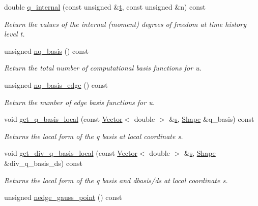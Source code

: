 \begin{DoxyCompactItemize}
double \hyperlink{classoomph_1_1TPoroelasticityElement_a6ac708ffa8850ca009ccedbb651a3152}{q\+\_\+internal} (const unsigned \&\hyperlink{cfortran_8h_af6f0bd3dc13317f895c91323c25c2b8f}{t}, const unsigned \&n) const
\begin{DoxyCompactList}\small\item\em Return the values of the internal (moment) degrees of freedom at time history level t. \end{DoxyCompactList}\item 
unsigned \hyperlink{classoomph_1_1TPoroelasticityElement_afdb47aa5ae5af5ddcc4bf3d1fbd4b066}{nq\+\_\+basis} () const
\begin{DoxyCompactList}\small\item\em Return the total number of computational basis functions for u. \end{DoxyCompactList}\item 
unsigned \hyperlink{classoomph_1_1TPoroelasticityElement_a65dd05b91f2953a7229042a4cf95257b}{nq\+\_\+basis\+\_\+edge} () const
\begin{DoxyCompactList}\small\item\em Return the number of edge basis functions for u. \end{DoxyCompactList}\item 
void \hyperlink{classoomph_1_1TPoroelasticityElement_aa432c3fedc655e17ee0e62d6d594eeaa}{get\+\_\+q\+\_\+basis\+\_\+local} (const \hyperlink{classoomph_1_1Vector}{Vector}$<$ double $>$ \&\hyperlink{cfortran_8h_ab7123126e4885ef647dd9c6e3807a21c}{s}, \hyperlink{classoomph_1_1Shape}{Shape} \&q\+\_\+basis) const
\begin{DoxyCompactList}\small\item\em Returns the local form of the q basis at local coordinate s. \end{DoxyCompactList}\item 
void \hyperlink{classoomph_1_1TPoroelasticityElement_a1fca2ce3e962fc273d38525d0e1f2865}{get\+\_\+div\+\_\+q\+\_\+basis\+\_\+local} (const \hyperlink{classoomph_1_1Vector}{Vector}$<$ double $>$ \&\hyperlink{cfortran_8h_ab7123126e4885ef647dd9c6e3807a21c}{s}, \hyperlink{classoomph_1_1Shape}{Shape} \&div\+\_\+q\+\_\+basis\+\_\+ds) const
\begin{DoxyCompactList}\small\item\em Returns the local form of the q basis and dbasis/ds at local coordinate s. \end{DoxyCompactList}\item 
unsigned \hyperlink{classoomph_1_1TPoroelasticityElement_a43bec0e682f98fd6961cd02bd469dac2}{nedge\+\_\+gauss\+\_\+point} () const

\end{DoxyCompactItemize}
